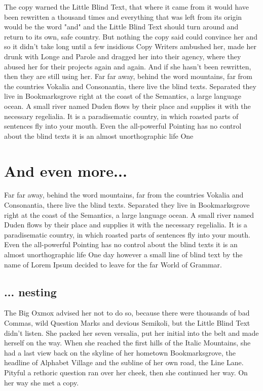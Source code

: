 The copy warned the Little Blind Text, that where it came from it would
have been rewritten a thousand times and everything that was left from its
origin would be the word "and" and the Little Blind Text should turn around
and return to its own, safe country. But nothing the copy said could
convince her and so it didn't take long until a few insidious Copy Writers
ambushed her, made her drunk with Longe and Parole and dragged her into
their agency, where they abused her for their projects again and again. And
if she hasn't been rewritten, then they are still using her. Far far away,
behind the word mountains, far from the countries Vokalia and Consonantia,
there live the blind texts. Separated they live in Bookmarksgrove right at
the coast of the Semantics, a large language ocean. A small river named
Duden flows by their place and supplies it with the necessary
regelialia. It is a paradisematic country, in which roasted parts of
sentences fly into your mouth. Even the all-powerful Pointing has no
control about the blind texts it is an almost unorthographic life One 

\section{And even more...}
\label{sec:even-more}

Far far away, behind the word mountains, far from the countries Vokalia and
Consonantia, there live the blind texts. Separated they live in
Bookmarksgrove right at the coast of the Semantics, a large language
ocean. A small river named Duden flows by their place and supplies it with
the necessary regelialia. It is a paradisematic country, in which roasted
parts of sentences fly into your mouth. Even the all-powerful Pointing has
no control about the blind texts it is an almost unorthographic life One
day however a small line of blind text by the name of Lorem Ipsum decided
to leave for the far World of Grammar. 

\subsection{... nesting}
\label{sec:...-nesting}

The Big Oxmox advised her not to do so, because there were thousands of bad
Commas, wild Question Marks and devious Semikoli, but the Little Blind Text
didn't listen. She packed her seven versalia, put her initial into the belt
and made herself on the way. When she reached the first hills of the Italic
Mountains, she had a last view back on the skyline of her hometown
Bookmarksgrove, the headline of Alphabet Village and the subline of her own
road, the Line Lane. Pityful a rethoric question ran over her cheek, then
she continued her way. On her way she met a copy.

